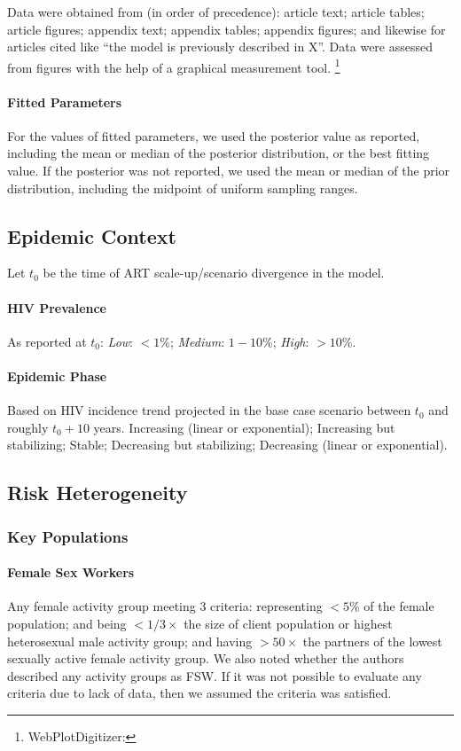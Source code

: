 Data were obtained from (in order of precedence):
article text; article tables; article figures; appendix text; appendix tables; appendix figures;
and likewise for articles cited like ``the model is previously described in X''.
Data were assessed from figures with the help of a graphical measurement tool.%
\footnote{WebPlotDigitizer: }
\paragraph{Fitted Parameters}
For the values of fitted parameters, we used the posterior value as reported, including
the mean or median of the posterior distribution, or the best fitting value.
If the posterior was not reported, we used the mean or median of the prior distribution,
including the midpoint of uniform sampling ranges.
\subsection{Epidemic Context}
\label{aa:defs:context}
Let $t_0$ be the time of ART scale-up/scenario divergence in the model.
\paragraph{HIV Prevalence}
As reported at $t_0$:
\emph{Low}: ${<1\%}$; \emph{Medium}: ${1-10\%}$; \emph{High}: ${>10\%}$.
\paragraph{Epidemic Phase}
Based on HIV incidence trend projected in the base case scenario between $t_0$ and roughly $t_0 + 10$ years.
Increasing (linear or exponential);
Increasing but stabilizing;
Stable;
Decreasing but stabilizing;
Decreasing (linear or exponential).
\subsection{Risk Heterogeneity}
\subsubsection{Key Populations}
\label{aaa:defs:kp}
\paragraph{Female Sex Workers}
Any female activity group meeting 3 criteria:
representing ${< 5\%}$ of the female population; and
being ${< 1/3 \times}$ the size of client population or highest heterosexual male activity group; and
having ${> 50 \times}$ the partners of the lowest sexually active female activity group.
\cite{}
We also noted whether the authors described any activity groups as FSW.
If it was not possible to evaluate any criteria due to lack of data,
then we assumed the criteria was satisfied.
